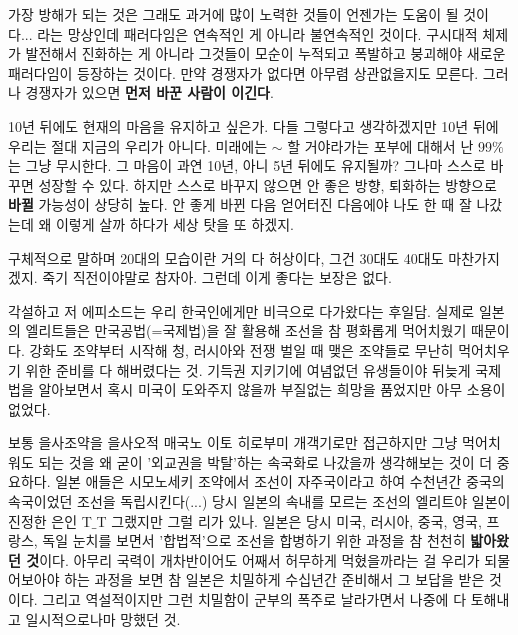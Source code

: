 가장 방해가 되는 것은 그래도 과거에 많이 노력한 것들이 언젠가는 도움이 될 것이다... 라는 망상인데
패러다임은 연속적인 게 아니라 불연속적인 것이다.
구시대적 체제가 발전해서 진화하는 게 아니라 그것들이 모순이 누적되고 폭발하고 붕괴해야 새로운 패러다임이 등장하는 것이다.
만약 경쟁자가 없다면 아무렴 상관없을지도 모른다. 그러나 경쟁자가 있으면 \textbf{먼저 바꾼 사람이 이긴다}.
\vspace{5mm}

10년 뒤에도 현재의 마음을 유지하고 싶은가.
다들 그렇다고 생각하겠지만 10년 뒤에 우리는 절대 지금의 우리가 아니다.
미래에는 $\sim$ 할 거야라가는 포부에 대해서 난 99$\%$는 그냥 무시한다.
그 마음이 과연 10년, 아니 5년 뒤에도 유지될까?
그나마 스스로 바꾸면 성장할 수 있다.
하지만 스스로 바꾸지 않으면 안 좋은 방향, 퇴화하는 방향으로 \textbf{바뀔} 가능성이 상당히 높다.
안 좋게 바뀐 다음 얻어터진 다음에야 나도 한 때 잘 나갔는데 왜 이렇게 살까 하다가 세상 탓을 또 하겠지.
\vspace{5mm}

구체적으로 말하며 20대의 모습이란 거의 다 허상이다, 그건 30대도 40대도 마찬가지겠지.
죽기 직전이야말로 참자아. 그런데 이게 좋다는 보장은 없다.
\vspace{5mm}

각설하고 저 에피소드는 우리 한국인에게만 비극으로 다가왔다는 후일담.
실제로 일본의 엘리트들은 만국공법(=국제법)을 잘 활용해 조선을 참 평화롭게 먹어치웠기 때문이다.
강화도 조약부터 시작해 청, 러시아와 전쟁 벌일 때 맺은 조약들로 무난히 먹어치우기 위한 준비를 다 해버렸다는 것.
기득권 지키기에 여념없던 유생들이야 뒤늦게 국제법을 알아보면서
혹시 미국이 도와주지 않을까 부질없는 희망을 품었지만 아무 소용이 없었다.
\vspace{5mm}

보통 을사조약을 을사오적 매국노 이토 히로부미 개객기로만 접근하지만
그냥 먹어치워도 되는 것을 왜 굳이 '외교권을 박탈'하는 속국화로 나갔을까 생각해보는 것이 더 중요하다.
일본 애들은 시모노세키 조약에서 조선이 자주국이라고 하여 수천년간 중국의 속국이었던 조선을 독립시킨다(...)
당시 일본의 속내를 모르는 조선의 엘리트야 일본이 진정한 은인 T$\_$T 그랬지만 그럴 리가 있나.
일본은 당시 미국, 러시아, 중국, 영국, 프랑스, 독일 눈치를 보면서 '합법적'으로 조선을 합병하기 위한 과정을 참 천천히 \textbf{밟아왔던 것}이다.
아무리 국력이 개차반이어도 어째서 허무하게 먹혔을까라는 걸 우리가 되물어보아야 하는 과정을 보면
참 일본은 치밀하게 수십년간 준비해서 그 보답을 받은 것이다.
그리고 역설적이지만 그런 치밀함이 군부의 폭주로 날라가면서 나중에 다 토해내고 일시적으로나마 망했던 것.
\vspace{5mm}

